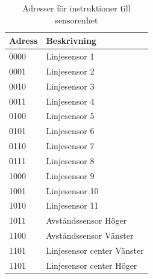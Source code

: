 \begin{table}[h!]
	\centering
	\begin{tabularx}{\textwidth}{| l | X |}
		\hline
		\textbf{Adress} & \textbf{Beskrivning} \\\hline
		{0000} & {Linjesensor 1} \\\hline
		{0001} & {Linjesensor 2} \\\hline
		{0010} & {Linjesensor 3} \\\hline
		{0011} & {Linjesensor 4} \\\hline
		{0100} & {Linjesensor 5} \\\hline
		{0101} & {Linjesensor 6} \\\hline
		{0110} & {Linjesensor 7} \\\hline
		{0111} & {Linjesensor 8} \\\hline
		{1000} & {Linjesensor 9} \\\hline
		{1001} & {Linjesensor 10} \\\hline
		{1010} & {Linjesensor 11} \\\hline
		{1011} & {Avståndssensor Höger} \\\hline
		{1100} & {Avståndssensor Vänster} \\\hline
		{1101} & {Linjesensor center Vänster} \\\hline
		{1101} & {Linjesensor center Höger} \\\hline
	\end{tabularx}
	\caption{Adresser för instruktioner till sensorenhet} \label{protokoll:huvud-sensor-adress}
\end{table}
